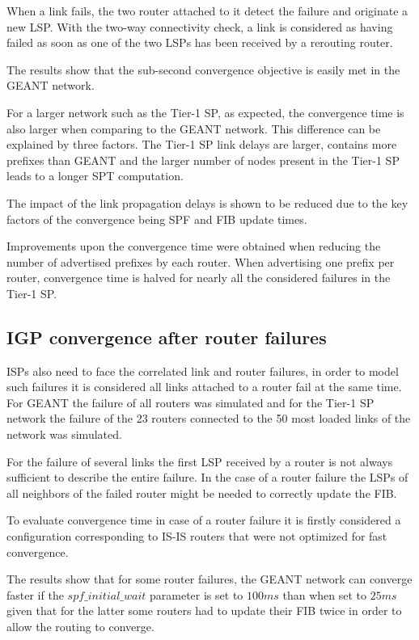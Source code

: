\documentclass[a4paper, 11pt, UTF8]{article}
\begin{document}
When a link fails, the two router attached to it detect the failure and originate a new LSP. 
With the two-way connectivity check, 
a link is considered as having failed as soon as one of the two LSPs has been received by a rerouting router.

The results show that the sub-second convergence objective is easily met in the GEANT network.

For a larger network such as the Tier-1 SP, as expected, the convergence time is also larger when comparing to the GEANT network.
This difference can be explained by three factors.
The Tier-1 SP link delays are larger, contains more prefixes than GEANT and the larger number of nodes present in the Tier-1 SP leads to a longer SPT computation.

The impact of the link propagation delays is shown to be reduced due to the key factors of the convergence being SPF and FIB update times.

Improvements upon the convergence time were obtained when reducing the number of advertised prefixes by each router. When advertising one prefix per router, convergence time is halved for nearly all the considered failures in the Tier-1 SP.

\subsection{IGP convergence after router failures}
ISPs also need to face the correlated link and router failures, in order to model such failures it is considered all links attached to a router fail at the same time.
For GEANT the failure of all routers was simulated and for the Tier-1 SP network the failure of the 23 routers connected to the 50 most loaded links of the network was simulated.

For the failure of several links the first LSP received by a router is not always sufficient to describe the entire failure. In the case of a router failure the LSPs of all neighbors of the failed router might be needed to correctly update the FIB.

To evaluate convergence time in case of a router failure it is firstly considered a configuration corresponding to IS-IS routers that were not optimized for fast convergence.

The results show that for some router failures, the GEANT network can converge faster if the $spf\_initial\_wait$ parameter is set to $100ms$ than when set to $25ms$ given that for the latter some routers had to update their FIB twice in order to allow the routing to converge.
\end{document}
